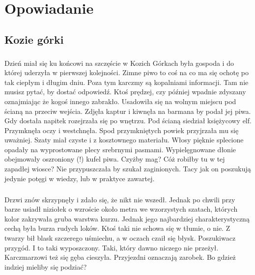 \documentclass[10pt,twoside,twocolumn]{book}
\begin{document}
\onecolumn
\large
\chapter{Opowiadanie}
\section*{Kozie górki}
\paragraph{}
Dzień miał się ku końcowi na szczęście w Kozich Górkach była gospoda i do której uderzyła w pierwszej kolejności.
Zimne piwo to coś na co ma się ochotę po tak ciepłym i długim dniu. 
Poza tym karczmy są kopalniami informacji. Tam nie musisz pytać, by dostać odpowiedź. 
Ktoś prędzej, czy później wpadnie zdyszany oznajmiając że kogoś innego zabrakło. 
Usadowiła się na wolnym miejscu pod ścianą na przeciw wejścia. 
Zdjęła kaptur i kiwnęła na barmana by podał jej piwa.
Gdy dostała napitek rozejrzała się po wnętrzu. 
Pod ścianą siedział księżycowy elf. 
Przymknęła oczy i westchnęła. 
Spod przymkniętych powiek przyjrzała mu się  uważniej. 
Szaty miał czyste i z kosztownego materiału. 
Włosy pięknie splecione opadały na wyprostowane plecy srebrnymi pasmami. 
Wypielęgnowane dłonie obejmowały oszroniony (!) kufel piwa. 
Czyżby mag? 
Cóż robiłby tu w tej zapadłej wiosce? 
Nie przypuszczała by szukał zaginionych. 
Tacy jak on poszukują jedynie potęgi w wiedzy, lub w praktyce zawartej.

\paragraph{}
Drzwi znów skrzypnęły i zdało się, że nikt nie wszedł. 
Jednak po chwili przy barze usiadł niziołek o wzroście około metra we wzorzystych szatach, których kolor zakrywała gruba warstwa kurzu. 
Jednak jego najbardziej charakterystyczną cechą była burza rudych loków. 
Ktoś taki nie schowa się w tłumie, o nie. 
Z twarzy bił blask szczerego uśmiechu, a w oczach czaił się błysk. 
Poszukiwacz przygód. 
I to taki wyposzczony. 
Taki, który dawno niczego nie przeżył. 
Karczmarzowi też się gęba cieszyła. 
Przyjezdni oznaczają zarobek. 
Bo gdzież indziej mieliby się podziać?
\end{document}
